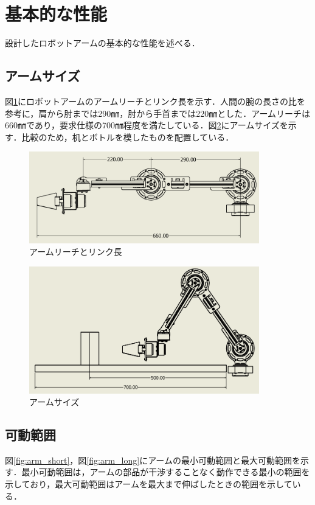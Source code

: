 \section{基本的な性能}
設計したロボットアームの基本的な性能を述べる．
\subsection{アームサイズ}
図\ref{fig:link_length}にロボットアームのアームリーチとリンク長を示す．人間の腕の長さの比\cite{humanArm}を参考に，肩から肘までは290㎜，肘から手首までは220㎜とした．アームリーチは660㎜であり，要求仕様の700㎜程度を満たしている．図\ref{fig:arm_size}にアームサイズを示す．比較のため，机とボトルを模したものを配置している．

\begin{figure}[htbp]
  \centering
  \includegraphics[width=10cm]{images/link_length.png}
  \caption{アームリーチとリンク長}
  \label{fig:link_length}
\end{figure}

\begin{figure}[htbp]
  \centering
  \includegraphics[width=10cm]{images/hikaku.png}
  \caption{アームサイズ}
  \label{fig:arm_size}
\end{figure}

\clearpage

\subsection{可動範囲}
図\ref{fig:arm_short}，図\ref{fig:arm_long}にアームの最小可動範囲と最大可動範囲を示す．最小可動範囲は，アームの部品が干渉することなく動作できる最小の範囲を示しており，最大可動範囲はアームを最大まで伸ばしたときの範囲を示している．

